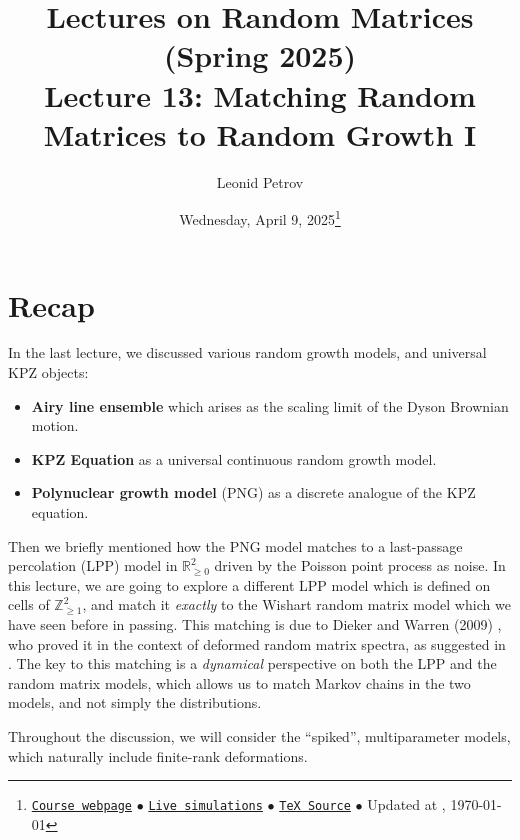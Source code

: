 \documentclass[letterpaper,11pt,oneside,reqno]{article}
\numberwithin{equation}{section}
\theoremstyle{definition}
\begin{document}
\title{Lectures on Random Matrices
(Spring 2025)
\\Lecture 13: Matching Random Matrices to Random Growth I}


\date{Wednesday, April 9, 2025\footnote{\href{https://lpetrov.cc/rmt25/}{\texttt{Course webpage}}
$\bullet$ \href{https://lpetrov.cc/simulations/model/random-matrices/}{\texttt{Live simulations}}
$\bullet$ \href{https://lpetrov.cc/rmt25/rmt25-notes/rmt2025-l13.tex}{\texttt{TeX Source}}
$\bullet$
Updated at \currenttime, \today}}



\author{Leonid Petrov}


\maketitle

\section{Recap}

In the last lecture, we discussed various random growth models, and universal KPZ objects:
\begin{itemize}
	\item \textbf{Airy line ensemble} which arises as the scaling limit of the Dyson Brownian motion.
	\item \textbf{KPZ Equation} as a universal continuous random growth model.
	\item \textbf{Polynuclear growth model} (PNG) as a discrete analogue of the KPZ equation.
\end{itemize}

Then we briefly mentioned how the PNG model matches to a
last-passage percolation (LPP) model in
$\mathbb{R}^2_{\ge0}$ driven by the Poisson
point process as noise.
In this lecture, we are going to explore a different
LPP model which is defined on cells of $\mathbb{Z}_{\ge1}^{2}$, and
match it \emph{exactly} to the Wishart random matrix model which we have seen before in passing.
This matching is due to Dieker and Warren (2009)
\cite{dieker2008largest}, who proved it
in the context
of deformed random matrix spectra,
as suggested in
\cite{BorodinPeche2009}.
The key to this matching is a \emph{dynamical} perspective
on both the LPP and the random matrix models, which allows us to
match Markov chains in the two models, and not simply the distributions.

Throughout the discussion, we will consider the ``spiked'', multiparameter models,
which naturally include finite-rank deformations.
\end{document}
